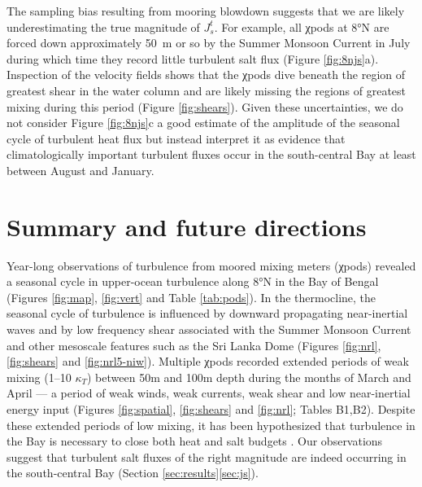 \documentclass[onecol]{ametsoc}
\begin{document}
The sampling bias resulting from mooring blowdown suggests that we are likely underestimating the true magnitude of $J_s^t$.
For example, all χpods at 8°N are forced down approximately \SI{50}{m} or so by the Summer Monsoon Current in July during which time they record little turbulent salt flux (Figure \ref{fig:8njs}a).
Inspection of the velocity fields shows that the χpods dive beneath the region of greatest shear in the water column and are likely missing the regions of greatest mixing during this period (Figure \ref{fig:shears}).
Given these uncertainties, we do not consider Figure \ref{fig:8njs}c a good estimate of the amplitude of the seasonal cycle of turbulent heat flux but instead interpret it as evidence that climatologically important turbulent fluxes occur in the south-central Bay at least between August and January.

\section{Summary and future directions}
\label{sec:org3230bcc}

Year-long observations of turbulence from moored mixing meters (χpods) revealed a seasonal cycle in upper-ocean turbulence along 8°N in the Bay of Bengal (Figures \ref{fig:map}, \ref{fig:vert} and Table \ref{tab:pods}).
In the thermocline, the seasonal cycle of turbulence is influenced by downward propagating near-inertial waves and by low frequency shear associated with the Summer Monsoon Current and other mesoscale features such as the Sri Lanka Dome (Figures \ref{fig:nrl}, \ref{fig:shears} and \ref{fig:nrl5-niw}).
Multiple χpods recorded extended periods of weak mixing (1--10 \(κ_T\)) between 50m and 100m depth during the months of March and April --- a period of weak winds, weak currents, weak shear and low near-inertial energy input (Figures \ref{fig:spatial}, \ref{fig:shears} and \ref{fig:nrl}; Tables B1,B2).
Despite these extended periods of low mixing, it has been hypothesized that turbulence in the Bay is necessary to close both heat and salt budgets \citep{Shenoi2002,Vinayachandran2013,Wilson2016a}.
Our observations suggest that turbulent salt fluxes of the right magnitude are indeed occurring in the south-central Bay (Section \ref{sec:results}\ref{sec:js}).
\end{document}
